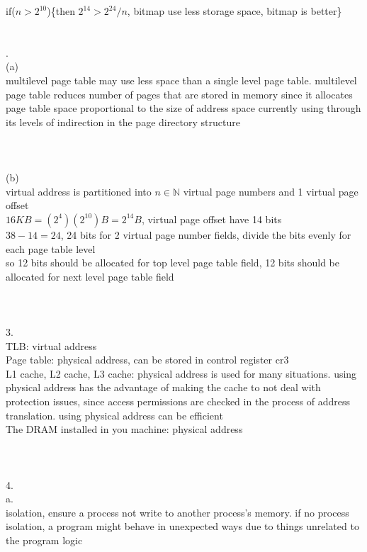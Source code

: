 \documentclass[12pt, border = 4pt, multi]{article} %
\begin{document}
if($n > 2 ^ {10}$)\{then $2 ^ {14} > 2 ^ {24} / n$, bitmap use less storage space, bitmap is better\}\\
\\
\\
\newpage
{}.\\
(a)\\
multilevel page table may use less space than a single level page table. multilevel page table reduces number of pages that are stored in memory since it allocates page table space proportional to the size of address space currently using through its levels of indirection in the page directory structure\\
\\
\\
\\
(b)\\
virtual address is partitioned into $n \in \mathbb{N}$ virtual page numbers and 1 virtual page offset\\
$16KB = (2 ^ 4)(2 ^ {10})B = 2 ^ {14}B$, virtual page offset have 14 bits\\
$38 - 14 = 24$, 24 bits for 2 virtual page number fields, divide the bits evenly for each page table level\\
so 12 bits should be allocated for top level page table field, 12 bits should be allocated for next level page table field\\
\\
\\
\\
3.\\
TLB: virtual address\\
Page table: physical address, can be stored in control register cr3\\
L1 cache, L2 cache, L3 cache: physical address is used for many situations. using physical address has the advantage of making the cache to not deal with protection issues, since access permissions are checked in the process of address translation. using physical address can be efficient\\
The DRAM installed in you machine: physical address\\
\\
\\
\\
4.\\
a.\\
isolation, ensure a process not write to another process's memory. if no process isolation, a program might behave in unexpected ways due to things unrelated to the program logic\\
\end{document}
